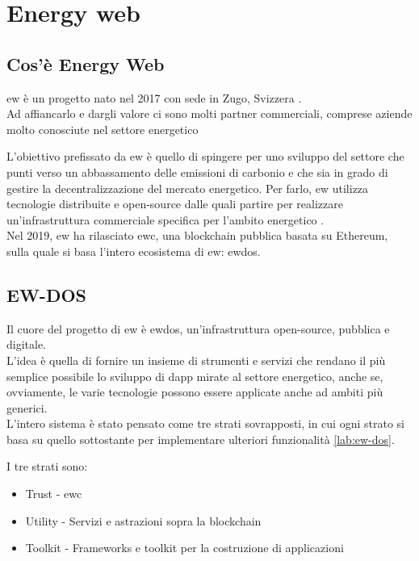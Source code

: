 \chapter{Energy web}

\section{Cos'è Energy Web}
\gls{ew} è un progetto nato nel 2017 con sede in Zugo, Svizzera \cite{wiki:ew-history}. \\
Ad affiancarlo e dargli valore ci sono molti partner commerciali, comprese aziende molto conosciute nel settore energetico \cite{wiki:ew-affiliate}

L'obiettivo prefissato da \gls{ew} è quello di spingere per uno sviluppo del settore che punti verso un abbassamento delle emissioni di carbonio e che sia in grado di gestire la decentralizzazione del mercato energetico.
Per farlo, \gls{ew} utilizza tecnologie distribuite e open-source dalle quali partire per realizzare un'infrastruttura commerciale specifica per l'ambito energetico \cite{wiki:ew-about}. \\ 

Nel 2019, \gls{ew} ha rilasciato \gls{ewc}, una blockchain pubblica basata su Ethereum, sulla quale si basa l'intero ecosistema di \gls{ew}: \gls{ewdos}.

\section{EW-DOS}
Il cuore del progetto di \gls{ew} è \gls{ewdos}, un'infrastruttura open-source, pubblica e digitale. \\
L'idea è quella di fornire un insieme di strumenti e servizi che rendano il più semplice possibile lo sviluppo di \gls{dapp} mirate al settore energetico, 
anche se, ovviamente, le varie tecnologie possono essere applicate anche ad ambiti più generici. \\

L'intero sistema è stato pensato come tre strati sovrapposti, in cui ogni strato si basa su quello sottostante per implementare ulteriori funzionalità \autoref{lab:ew-dos}.

I tre strati sono:
\begin{itemize}
    \item Trust - \gls{ewc}
    \item Utility - Servizi e astrazioni sopra la blockchain
    \item Toolkit - Frameworks e toolkit per la costruzione di applicazioni
\end{itemize}

